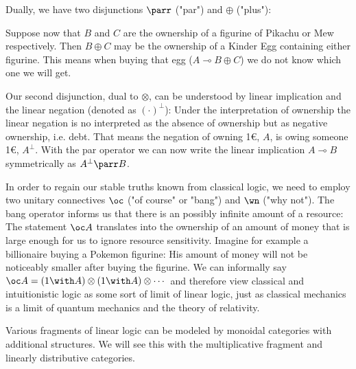 \documentclass[DIN, pagenumber=false, fontsize=11pt, parskip=half, colorinlistoftodos, svgnames]{scrartcl}
\begin{document}
	Dually, we have two disjunctions $\parr$ ("par") and $\oplus$ ("plus"):
	
	Suppose now that $B$ and $C$ are the ownership of a figurine of Pikachu or Mew respectively. Then $B \oplus C$ may be the ownership of a Kinder Egg containing either figurine. This means when buying that egg ($A \multimap B \oplus C$) we do not know which one we will get. 
	
	Our second disjunction, dual to $\otimes$, can be understood by linear implication and the linear negation (denoted as $(\cdot)^\bot$): Under the interpretation of ownership the linear negation is no interpreted as the absence of ownership but as negative ownership, i.e. debt. That means the negation of owning 1\euro, $A$, is owing someone 1\euro, $A^\bot$. With the par operator we can now write the linear implication $A \multimap B$ symmetrically as $A^\bot \parr B$. 
	
	In order to regain our stable truths known from classical logic, we need to employ two unitary connectives $\oc$ ("of course" or "bang") and $\wn$ ("why not"). 
	The bang operator informs us that there is an possibly infinite amount of a resource: 
	The statement $\oc A$ translates into the ownership of an amount of money that is large enough for us to ignore resource sensitivity. 
	Imagine for example a billionaire buying a Pokemon figurine: His amount of money will not be noticeably smaller after buying the figurine. We can informally say $\oc A = (1 \with A) \otimes (1 \with A) \otimes \cdots $ and therefore view classical and intuitionistic logic as some sort of limit of linear logic, just as classical mechanics is a limit of quantum mechanics and the theory of relativity. 
	
	
	
	Various fragments of linear logic can be modeled by monoidal categories with additional structures. We will see this with the multiplicative fragment and linearly distributive categories.
	
\end{document}
